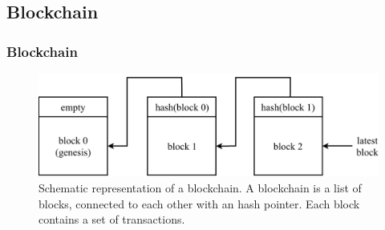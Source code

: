 \documentclass[pdf]{beamer}
\begin{document}
\subsection{Blockchain}
\begin{frame}
	\frametitle{Blockchain}
	\begin{figure}
		\centering
		\vspace*{0.5cm}
		\includegraphics[width=\columnwidth]{figures/blockchain}
		\vspace*{0.5cm}
		\caption{
			Schematic representation of a blockchain.
			A blockchain is a list of blocks, connected to each other with an hash pointer.
			Each block contains a set of transactions.
		}
	\end{figure}
\end{frame}
\end{document}
